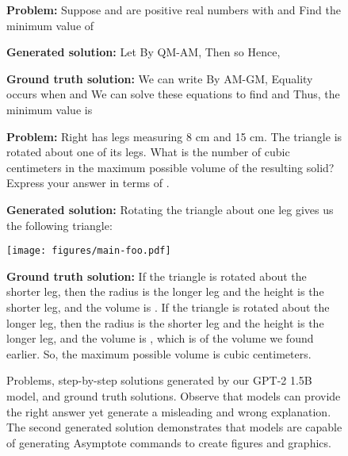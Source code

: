 \documentclass{article}
\begin{document}
\begin{figure*}[t]
\vspace{-15pt}
\noindent

\textbf{Problem:} Suppose  and  are positive real numbers with  and   Find the minimum value of 

\textbf{Generated solution:} 
Let   By QM-AM,
 Then  so   Hence,


\textbf{Ground truth solution:} We can write
 By AM-GM,
 Equality occurs when  and   We can solve these equations to find  and   Thus, the minimum value is 

\hrulefill

\textbf{Problem:} Right  has legs measuring 8 cm and 15 cm. The triangle is rotated about one of its legs. What is the number of cubic centimeters in the maximum possible volume of the resulting solid? Express your answer in terms of .

\textbf{Generated solution:} Rotating the triangle about one leg gives us the following triangle:


\begin{minipage}{0.4\textwidth}
\texttt{[image: figures/main-foo.pdf]}
\end{minipage}\begin{minipage}{0.6\textwidth} 

\end{minipage}

\textbf{Ground truth solution:} If the triangle is rotated about the shorter leg, then the radius is the longer leg and the height is the shorter leg, and the volume is . If the triangle is rotated about the longer leg, then the radius is the shorter leg and the height is the longer leg, and the volume is , which is  of the volume we found earlier.  So, the maximum possible volume is  cubic centimeters.

\caption{Problems, step-by-step solutions generated by our GPT-2 1.5B model, and ground truth solutions. Observe that models can provide the right answer yet generate a misleading and wrong explanation. The second generated solution demonstrates that models are capable of generating Asymptote commands to create figures and graphics.}
\label{fig:generated_examples1}
\vspace{-5pt}
\end{figure*}
\end{document}
